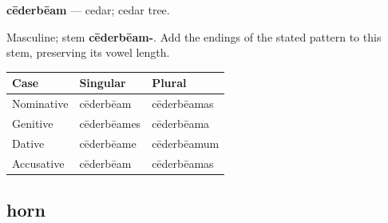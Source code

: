 \par\begin{minipage}{\linewidth}\raggedright
\textbf{cēderbēam} — cedar; cedar tree.

Masculine; stem \textbf{cēderbēam-}. Add the endings of the stated pattern to this stem, preserving its vowel length.

\par\begingroup
\fontsize{10.5}{13.2}\selectfont
\setlength{\LTleft}{0pt}\setlength{\LTright}{\fill}
\noindent
\begin{tabular}{@{}>{\raggedright\arraybackslash}p{36.99mm}>{\raggedright\arraybackslash}p{40.69mm}>{\raggedright\arraybackslash}p{40.69mm}@{}}
\toprule
\textbf{Case} & \textbf{Singular} & \textbf{Plural} \\
\midrule
Nominative & cēderbēam & cēderbēamas \\
Genitive & cēderbēames & cēderbēama \\
Dative & cēderbēame & cēderbēamum \\
Accusative & cēderbēam & cēderbēamas \\
\bottomrule
\end{tabular}
\par\endgroup

\end{minipage}\par
{}
\subsection*{horn}

